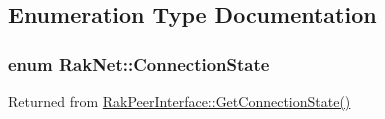 \subsection{Enumeration Type Documentation}
\hypertarget{namespace_rak_net_a84a0fb005391f71130dd341f77f62138}{
\subsubsection[{Connection\-State}]{\setlength{\rightskip}{0pt plus 5cm}enum {\bf Rak\-Net\-::\-Connection\-State}}}\label{namespace_rak_net_a84a0fb005391f71130dd341f77f62138}


Returned from \hyperlink{class_rak_net_1_1_rak_peer_interface_a33744f90a202b8e57d6a825d6af080cc}{Rak\-Peer\-Interface\-::\-Get\-Connection\-State()} 

